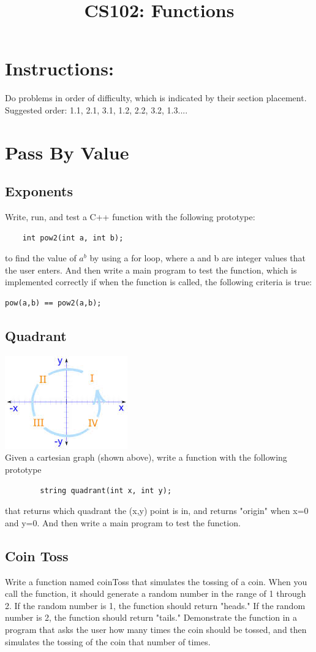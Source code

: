 \documentclass{article}
\begin{document}
\title{CS102: Functions}

\maketitle
\section*{Instructions:}
Do problems in order of difficulty, which is indicated by their section placement. Suggested order: 1.1, 2.1, 3.1, 1.2, 2.2, 3.2,  1.3....
\section{Pass By Value}

\subsection{Exponents}
Write, run, and test a C++ function with the following prototype:
\begin{verbatim}
	int pow2(int a, int b);
\end{verbatim}
to find the value of $a^{b}$  by using a for loop, where a and b are integer values that the user enters. And then write a main program to test the function, which is implemented correctly if when the function is called, the following criteria is true:
\begin{verbatim}
pow(a,b) == pow2(a,b);
\end{verbatim}

\subsection{Quadrant}
\includegraphics[width=.25\textwidth]{images}\\
Given a cartesian graph (shown above), write a function with the following prototype 
\begin{verbatim}
        string quadrant(int x, int y);
\end{verbatim}
that returns which quadrant the (x,y) point is in, and returns "origin" when x=0 and y=0. And then write a main program to test the function.

\subsection{Coin Toss}
Write a function named coinToss that simulates the tossing of a coin. When you call the function, it should generate a random number in the range of 1 through 2. If the random number is 1, the function should return "heads." If the random number is 2, the function should return "tails." Demonstrate the function in a program that asks the user how many times  the coin should be tossed, and then simulates the tossing of the coin that number of times. 
\end{document}

